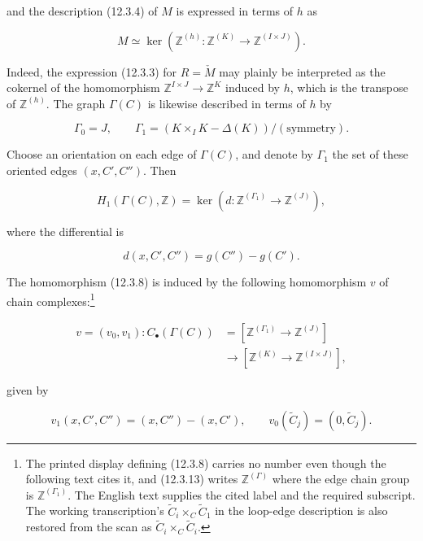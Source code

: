 \noindent
and the description (12.3.4) of $M$ is expressed in terms of $h$ as

\begin{equation}\tag{12.3.10}
 M\simeq\ker\left(
  \mathbb Z^{(h)}:\mathbb Z^{(K)}\longrightarrow
  \mathbb Z^{(I\times J)}\right).
\end{equation}

Indeed, the expression (12.3.3) for $R=\check M$ may plainly be
interpreted as the cokernel of the homomorphism
$\mathbb Z^{I\times J}\to\mathbb Z^K$ induced by $h$, which is the
transpose of $\mathbb Z^{(h)}$. The graph $\Gamma(C)$ is likewise described
in terms of $h$ by

\begin{equation*}
 \Gamma_0=J,
 \qquad
 \Gamma_1=(K\times_I K-\Delta(K))/(\text{symmetry}).
\end{equation*}

Choose an orientation on each edge of $\Gamma(C)$, and denote by
$\Gamma_1$ the set of these oriented edges $(x,C',C'')$. Then

\begin{equation}\tag{12.3.11}
 H_1(\Gamma(C),\mathbb Z)=
 \ker\left(d:\mathbb Z^{(\Gamma_1)}\longrightarrow\mathbb Z^{(J)}\right),
\end{equation}

\noindent
where the differential is

\begin{equation}\tag{12.3.12}
 d(x,C',C'')=g(C'')-g(C').
\end{equation}

The homomorphism (12.3.8) is induced by the following homomorphism $v$ of
chain complexes:\footnote{The printed display defining (12.3.8) carries
no number even though the following text cites it, and (12.3.13) writes
$\mathbb Z^{(\Gamma)}$ where the edge chain group is
$\mathbb Z^{(\Gamma_1)}$. The English text supplies the cited label and
the required subscript. The working transcription's
$\widetilde C_i\times_C\widetilde C_1$ in the loop-edge description is
also restored from the scan as
$\widetilde C_i\times_C\widetilde C_i$.}

\begin{equation}\tag{12.3.13}
 \begin{split}
 v=(v_0,v_1):C_\bullet(\Gamma(C))
   &=\left[\mathbb Z^{(\Gamma_1)}\longrightarrow\mathbb Z^{(J)}\right]\\
   &\longrightarrow
     \left[\mathbb Z^{(K)}\longrightarrow\mathbb Z^{(I\times J)}\right],
 \end{split}
\end{equation}

\noindent
given by

\begin{equation}\tag{12.3.14}
 v_1(x,C',C'')=(x,C'')-(x,C'),
 \qquad
 v_0(\widetilde C_j)=(0,\widetilde C_j).
\end{equation}
